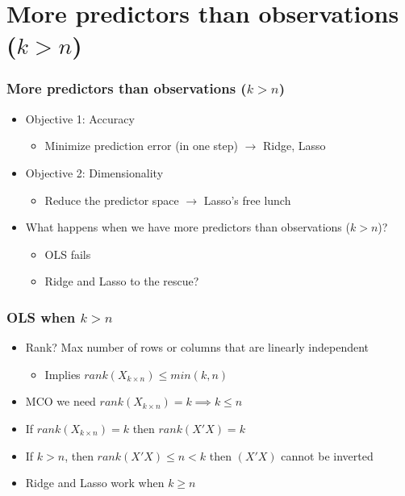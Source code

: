 \documentclass[
  shownotes,
  xcolor={svgnames},
  hyperref={colorlinks,citecolor=DarkBlue,linkcolor=DarkRed,urlcolor=DarkBlue}
  , aspectratio=169]{beamer}
\begin{document}
\section{More predictors than observations ($k>n$)}
\begin{frame}[fragile]
\frametitle{More predictors than observations ($k>n$)}

\begin{itemize}
  \item Objective 1: Accuracy
  \begin{itemize}
    \item Minimize prediction error (in one step) $\rightarrow$ Ridge, Lasso
    \end{itemize}
    \medskip
  \item Objective 2: Dimensionality
  \begin{itemize}
    \item Reduce the predictor space $\rightarrow$ Lasso's free lunch
    \end{itemize}
\end{itemize}
\medskip
\pause
\begin{itemize}
  \item What happens when we have more predictors than observations ($k>n$)?
  \begin{itemize}
   \item OLS fails
   \medskip
   \item Ridge and Lasso to the rescue?
  \end{itemize}
\end{itemize}

\end{frame}


\begin{frame}[fragile]
\frametitle{OLS when $k>n$}

\begin{itemize}
  \item Rank? Max number of rows or columns that are linearly independent
  \begin{itemize}
  \item Implies $rank(X_{k\times n}) \leq min(k,n)$
  \end{itemize}
  \bigskip
  \item MCO we need $rank(X_{k\times n})=k \implies k\leq n$
  \bigskip
  \item If $rank(X_{k\times n})=k$ then $rank(X'X)=k$
  \bigskip
  \item If $k>n$, then  $rank(X'X)\leq n < k$ then $(X'X)$ cannot be inverted
  \bigskip
  \item Ridge and Lasso work when $k \geq n$
\end{itemize}

\end{frame}
\end{document}
